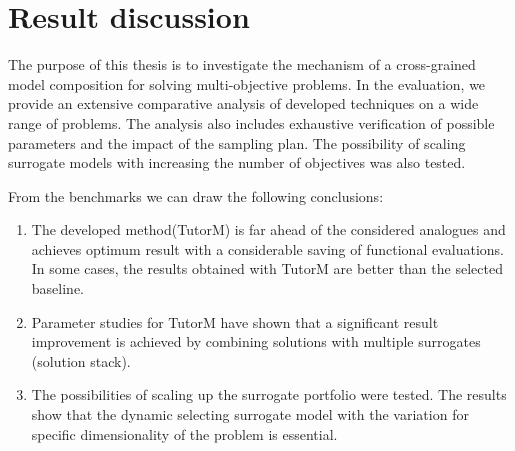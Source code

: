 \section{Result discussion}

The purpose of this thesis is to investigate the mechanism of a cross-grained model composition for solving multi-objective problems. In the evaluation, we provide an extensive comparative analysis of developed techniques on a wide range of problems. The analysis also includes exhaustive verification of possible parameters and the impact of the sampling plan. The possibility of scaling surrogate models with increasing the number of objectives was also tested.

From the benchmarks we can draw the following conclusions:
\begin{enumerate}
    \item The developed method(TutorM) is far ahead of the considered analogues and achieves optimum result with a considerable saving of functional evaluations. In some cases, the results obtained with TutorM are better than the selected baseline.
    \item Parameter studies for TutorM have shown that a significant result improvement is achieved by combining solutions with multiple surrogates (solution stack).
    \item The possibilities of scaling up the surrogate portfolio were tested. The results show that the dynamic selecting surrogate model with the variation for specific dimensionality of the problem is essential.
\end{enumerate}










